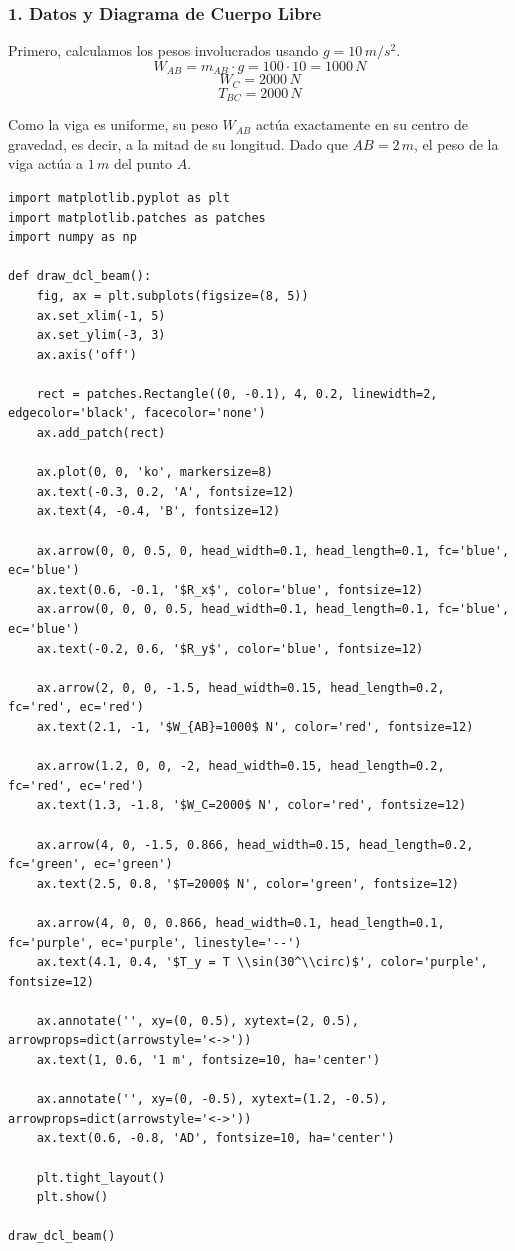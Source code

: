 \documentclass[12pt, a4paper]{article}
\begin{document}
\subsubsection*{1. Datos y Diagrama de Cuerpo Libre}
Primero, calculamos los pesos involucrados usando $g = 10 \, \si{m/s^2}$.
$$W_{AB} = m_{AB} \cdot g = 100 \cdot 10 = 1000 \, \si{N}$$
$$W_C = 2000 \, \si{N}$$
$$T_{BC} = 2000 \, \si{N}$$

Como la viga es uniforme, su peso $W_{AB}$ actúa exactamente en su centro de gravedad, es decir, a la mitad de su longitud. Dado que $AB = 2 \, \si{m}$, el peso de la viga actúa a $1 \, \si{m}$ del punto $A$.

\begin{lstlisting}
import matplotlib.pyplot as plt
import matplotlib.patches as patches
import numpy as np

def draw_dcl_beam():
    fig, ax = plt.subplots(figsize=(8, 5))
    ax.set_xlim(-1, 5)
    ax.set_ylim(-3, 3)
    ax.axis('off')
    
    rect = patches.Rectangle((0, -0.1), 4, 0.2, linewidth=2, edgecolor='black', facecolor='none')
    ax.add_patch(rect)
    
    ax.plot(0, 0, 'ko', markersize=8)
    ax.text(-0.3, 0.2, 'A', fontsize=12)
    ax.text(4, -0.4, 'B', fontsize=12)
    
    ax.arrow(0, 0, 0.5, 0, head_width=0.1, head_length=0.1, fc='blue', ec='blue')
    ax.text(0.6, -0.1, '$R_x$', color='blue', fontsize=12)
    ax.arrow(0, 0, 0, 0.5, head_width=0.1, head_length=0.1, fc='blue', ec='blue')
    ax.text(-0.2, 0.6, '$R_y$', color='blue', fontsize=12)
    
    ax.arrow(2, 0, 0, -1.5, head_width=0.15, head_length=0.2, fc='red', ec='red')
    ax.text(2.1, -1, '$W_{AB}=1000$ N', color='red', fontsize=12)
    
    ax.arrow(1.2, 0, 0, -2, head_width=0.15, head_length=0.2, fc='red', ec='red')
    ax.text(1.3, -1.8, '$W_C=2000$ N', color='red', fontsize=12)
    
    ax.arrow(4, 0, -1.5, 0.866, head_width=0.15, head_length=0.2, fc='green', ec='green')
    ax.text(2.5, 0.8, '$T=2000$ N', color='green', fontsize=12)
    
    ax.arrow(4, 0, 0, 0.866, head_width=0.1, head_length=0.1, fc='purple', ec='purple', linestyle='--')
    ax.text(4.1, 0.4, '$T_y = T \\sin(30^\\circ)$', color='purple', fontsize=12)

    ax.annotate('', xy=(0, 0.5), xytext=(2, 0.5), arrowprops=dict(arrowstyle='<->'))
    ax.text(1, 0.6, '1 m', fontsize=10, ha='center')
    
    ax.annotate('', xy=(0, -0.5), xytext=(1.2, -0.5), arrowprops=dict(arrowstyle='<->'))
    ax.text(0.6, -0.8, 'AD', fontsize=10, ha='center')

    plt.tight_layout()
    plt.show()

draw_dcl_beam()
\end{lstlisting}
\end{document}
